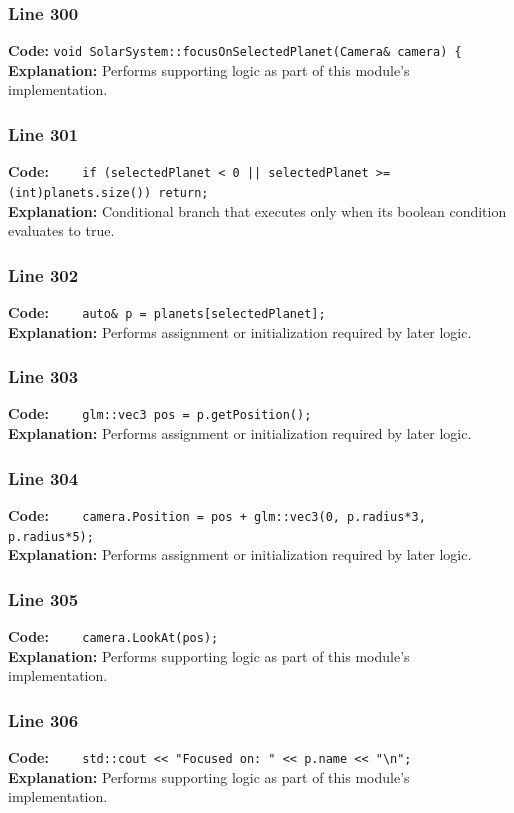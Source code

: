 \documentclass[11pt,a4paper]{article}
\begin{document}
\subsubsection*{Line 300}
\textbf{Code:} \verb|void SolarSystem::focusOnSelectedPlanet(Camera& camera) {|\\
\textbf{Explanation:} Performs supporting logic as part of this module's implementation.

\subsubsection*{Line 301}
\textbf{Code:} \verb!    if (selectedPlanet < 0 || selectedPlanet >= (int)planets.size()) return;!\\
\textbf{Explanation:} Conditional branch that executes only when its boolean condition evaluates to true.

\subsubsection*{Line 302}
\textbf{Code:} \verb|    auto& p = planets[selectedPlanet];|\\
\textbf{Explanation:} Performs assignment or initialization required by later logic.

\subsubsection*{Line 303}
\textbf{Code:} \verb|    glm::vec3 pos = p.getPosition();|\\
\textbf{Explanation:} Performs assignment or initialization required by later logic.

\subsubsection*{Line 304}
\textbf{Code:} \verb|    camera.Position = pos + glm::vec3(0, p.radius*3, p.radius*5);|\\
\textbf{Explanation:} Performs assignment or initialization required by later logic.

\subsubsection*{Line 305}
\textbf{Code:} \verb|    camera.LookAt(pos);|\\
\textbf{Explanation:} Performs supporting logic as part of this module's implementation.

\subsubsection*{Line 306}
\textbf{Code:} \verb|    std::cout << "Focused on: " << p.name << "\n";|\\
\textbf{Explanation:} Performs supporting logic as part of this module's implementation.
\end{document}
